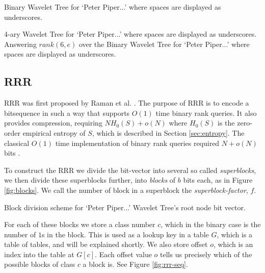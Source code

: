 			{Binary Wavelet Tree for `Peter Piper...' where spaces are displayed
			as underscores.}
			
			{4-ary Wavelet Tree for `Peter Piper...' where spaces are 
			displayed as underscores.}
\clearpage
			{Answering $rank(6, e)$ over the Binary Wavelet Tree for `Peter
			Piper...' where spaces are displayed as underscores.}












\subsection{RRR}
\label{sec:rrr}
RRR was first proposed by Raman et al. \cite{raman2007}. The purpose of RRR is 
to encode a bitsequence in such a way that supports $O(1)$ time binary rank 
queries. It also provides compression, 
requiring $N H_0(S) + o(N)$ where $H_0(S)$ is the zero-order empirical entropy 
of $S$, which is described in Section \ref{sec:entropy}.
The classical $O(1)$ time implementation of binary rank queries required 
$N + o(N)$ bits \cite{gonzalez2005}.

To construct the RRR we divide the bit-vector into several so called 
\emph{superblocks}, we then divide these superblocks further, into 
\emph{blocks} of $b$ bits each, as in Figure \ref{fig:blocks}. We call the 
number of block in a superblock the \emph{superblock-factor}, $f$.

			{Block division scheme for `Peter Piper...' Wavelet Tree's root
			node bit vector.}

For each of these blocks we store a class number $c$, which in the binary case 
is the number of  $1$s in the block. This is used as a lookup key in a table 
$G$, which is a table of tables, and will be explained shortly. We also store 
offset $o$, which is an index into the table at $G[c]$. Each offset value $o$ 
tells us precisely which of the possible blocks of class $c$ a block is. See 
Figure \ref{fig:rrr-seq}.

